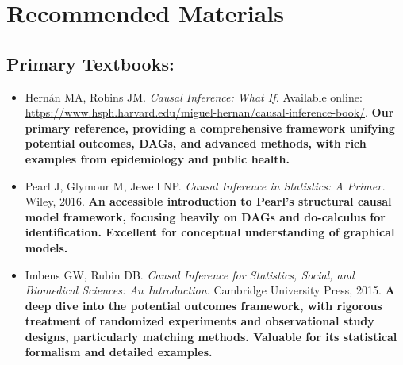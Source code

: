\documentclass[10.5pt]{article}
\begin{document}
\section{Recommended Materials}

\subsection{Primary Textbooks:}
\begin{itemize}
    \item Hernán MA, Robins JM. \textit{Causal Inference: What If.} Available online: \url{https://www.hsph.harvard.edu/miguel-hernan/causal-inference-book/}. \textbf{Our primary reference, providing a comprehensive framework unifying potential outcomes, DAGs, and advanced methods, with rich examples from epidemiology and public health.}
    \item Pearl J, Glymour M, Jewell NP. \textit{Causal Inference in Statistics: A Primer.} Wiley, 2016. \textbf{An accessible introduction to Pearl's structural causal model framework, focusing heavily on DAGs and do-calculus for identification. Excellent for conceptual understanding of graphical models.}
    \item Imbens GW, Rubin DB. \textit{Causal Inference for Statistics, Social, and Biomedical Sciences: An Introduction.} Cambridge University Press, 2015. \textbf{A deep dive into the potential outcomes framework, with rigorous treatment of randomized experiments and observational study designs, particularly matching methods. Valuable for its statistical formalism and detailed examples.}
\end{itemize}
\end{document}

